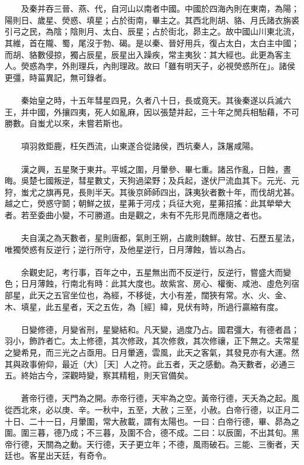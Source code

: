 \\\\
　　及秦并吞三晉、燕、代，自河山以南者中國。中國於四海內則在東南，為陽；陽則日、歲星、熒惑、填星；占於街南，畢主之。其西北則胡、貉、月氏諸衣旃裘引弓之民，為陰；陰則月、太白、辰星；占於街北，昴主之。故中國山川東北流，其維，首在隴、蜀，尾沒于勃、碣。是以秦、晉好用兵，復占太白，太白主中國；而胡、貉數侵掠，獨占辰星，辰星出入躁疾，常主夷狄：其大經也。此更為客主人。熒惑為孛，外則理兵，內則理政。故曰「雖有明天子，必視熒惑所在」。諸侯更彊，時菑異記，無可錄者。
\\\\
　　秦始皇之時，十五年彗星四見，久者八十日，長或竟天。其後秦遂以兵滅六王，并中國，外攘四夷，死人如亂麻，因以張楚并起，三十年之閒兵相駘藉，不可勝數。自蚩尤以來，未嘗若斯也。
\\\\
　　項羽救鉅鹿，枉矢西流，山東遂合從諸侯，西坑秦人，誅屠咸陽。
\\\\
　　漢之興，五星聚于東井。平城之圍，月暈參、畢七重。諸呂作亂，日蝕，晝晦。吳楚七國叛逆，彗星數丈，天狗過梁野；及兵起，遂伏尸流血其下。元光、元狩，蚩尤之旗再見，長則半天。其後京師師四出，誅夷狄者數十年，而伐胡尤甚。越之亡，熒惑守鬬；朝鮮之拔，星茀于河戍；兵征大宛，星茀招搖：此其犖犖大者。若至委曲小變，不可勝道。由是觀之，未有不先形見而應隨之者也。
\\\\
　　夫自漢之為天數者，星則唐都，氣則王朔，占歲則魏鮮。故甘、石歷五星法，唯獨熒惑有反逆行；逆行所守，及他星逆行，日月薄蝕，皆以為占。
\\\\
　　余觀史記，考行事，百年之中，五星無出而不反逆行，反逆行，嘗盛大而變色；日月薄蝕，行南北有時：此其大度也。故紫宮、房心、權衡、咸池、虛危列宿部星，此天之五官坐位也，為經，不移徙，大小有差，闊狹有常。水、火、金、木、填星，此五星者，天之五佐，為［經］緯，見伏有時，所過行贏縮有度。
\\\\
　　日變修德，月變省刑，星變結和。凡天變，過度乃占。國君彊大，有德者昌；羽小，飾詐者亡。太上修德，其次修政，其次修救，其次修禳，正下無之。夫常星之變希見，而三光之占亟用。日月暈適，雲風，此天之客氣，其發見亦有大運。然其與政事俯仰，最近（大）［天］人之符。此五者，天之感動。為天數者，必通三五。終始古今，深觀時變，察其精粗，則天官備矣。
\\\\
　　蒼帝行德，天門為之開。赤帝行德，天牢為之空。黃帝行德，天夭為之起。風從西北來，必以庚、辛。一秋中，五至，大赦；三至，小赦。白帝行德，以正月二十日、二十一日，月暈圍，常大赦載，謂有太陽也。一曰：白帝行德，畢、昴為之圍。圍三暮，德乃成；不三暮，及圍不合，德不成。二曰：以辰圍，不出其旬。黑帝行德，天關為之動。天行德，天子更立年；不德，風雨破石。三能、三衡者，天廷也。客星出天廷，有奇令。